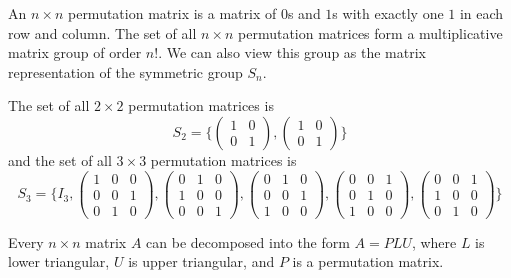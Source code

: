 \documentclass{article}
\begin{document}
    \begin{definition}
    An $n \times n$ permutation matrix is a matrix of $0$s and $1$s with exactly one $1$ in each row and column. The set of all $n \times n$ permutation matrices form a multiplicative matrix group of order $n!$. We can also view this group as the matrix representation of the symmetric group $S_n$. 
    \end{definition}

    \begin{example}
    The set of all $2 \times 2$ permutation matrices is 
    \[S_2 = \bigg\{  \begin{pmatrix}1 & 0 \\0 & 1 \end{pmatrix}, \begin{pmatrix}1 & 0 \\0 & 1 \end{pmatrix} \bigg\}\]
    and the set of all $3 \times 3$ permutation matrices is
    \[S_3 = \Bigg\{I_3, 
    \begin{pmatrix}1 & 0 & 0 \\0 & 0 & 1 \\0 & 1 & 0 \end{pmatrix},
    \begin{pmatrix}0 & 1 & 0 \\1 & 0 & 0 \\0 & 0 & 1 \end{pmatrix}, 
    \begin{pmatrix}0 & 1 & 0 \\0 & 0 & 1 \\1 & 0 & 0 \end{pmatrix}, 
    \begin{pmatrix}0 & 0 & 1 \\0 & 1 & 0 \\1 & 0 & 0 \end{pmatrix}, 
    \begin{pmatrix}0 & 0 & 1 \\1 & 0 & 0 \\0 & 1 & 0 \end{pmatrix} \Bigg\} \]
    \end{example}

    \begin{theorem}
    Every $n \times n$ matrix $A$ can be decomposed into the form $A = P L U$, where $L$ is lower triangular, $U$ is upper triangular, and $P$ is a permutation matrix. 
    \end{theorem}
\end{document}
